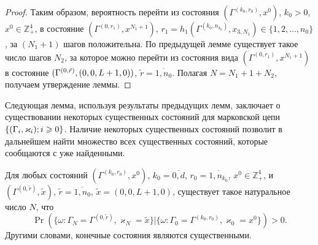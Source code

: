 \documentclass{report}
\newcommand{\Mark}{\{(\Gamma_i, \varkappa_i); \hm{} i \geqslant 0\}}
\begin{document}
\begin{proof}
Таким образом, вероятность перейти из состояния $(\Gamma^{(k_0,r_0)},x^0)$, $k_0>0$, $x^0 \in \mathbb{Z}_+^4$, в состояние $(\Gamma^{(0,r_1)},x^{N_1+1})$, $r_1=h_1(\Gamma^{(k_0,n_{k_0})},x_{3,N_1}) \in \{1, 2, \ldots, n_0\}$,
за $(N_1+1)$ шагов положительна. По предыдущей лемме существует такое число шагов $N_2$, за которое можно перейти из состояния вида $(\Gamma^{(0,r_1)},x^{N_1+1})$ в состояние $(\Gamma^{(0,\tilde{r})},(0,0,L\hm+1,0))$, $\tilde{r}=\overline{1,n_0}$. Полагая $N=N_1+1+N_2$, получаем утверждение леммы.
\end{proof}

Следующая лемма, используя результаты предыдущих лемм, заключает о существовании некоторых существенных состояний для марковской цепи $\Mark$. Наличие некоторых существенных состояний позволит в дальнейшем найти множество всех существенных состояний, которые сообщаются с уже найденными.
\begin{lemma}\label{all:in:one}
Для любых состояний $(\Gamma^{(k_0,r_0)},x^0)$, $k_0=\overline{0,d}$, $r_0=\overline{1,n_{k_0}}$, $x^0 \in \mathbb{Z}_+^4$, и $(\Gamma^{(0,\tilde{r})},\tilde{x})$, $\tilde{r} = \overline{1,n_0}$, $\tilde{x}=(0,0,L+1,0)$, существует такое натуральное число $N$, что 
\begin{equation*}
\Pr(\{\omega\colon \Gamma_{N}=\Gamma^{(0,\tilde{r} )}, \varkappa_{N}=\tilde{x}\}|
\{\omega\colon \Gamma_{0}=\Gamma^{(k_0,r_0)}, \varkappa_{0}=x^0\})>0.
\end{equation*}
Другими словами, конечные состояния являются существенными.
\label{first:lemma}
\end{lemma}
\end{document}
